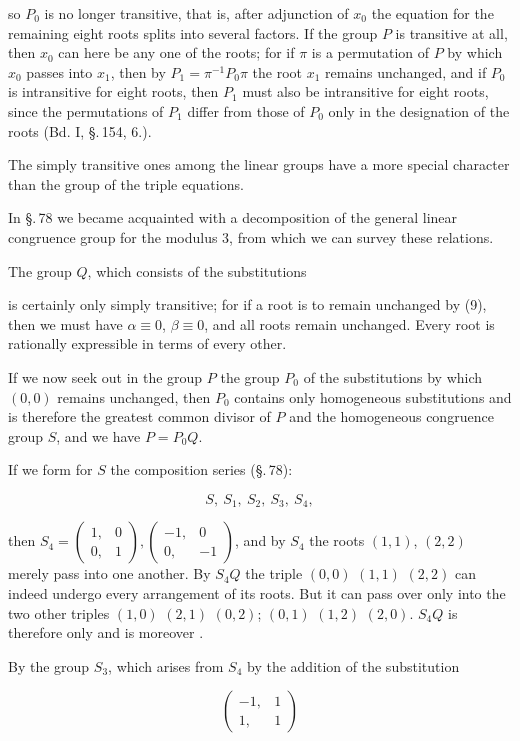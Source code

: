 so $P_0$ is no longer transitive, that is, after adjunction of $x_0$
the equation for the remaining eight roots splits into several factors. If the
group $P$ is transitive at all, then $x_0$ can here be any one of the roots;
for if $\pi$ is a permutation of $P$ by which $x_0$ passes into $x_1$,
then by $P_1 = \pi^{-1} P_0 \pi$ the root $x_1$ remains unchanged, and if $P_0$
is intransitive for eight roots, then $P_1$ must also be intransitive for eight roots,
since the permutations of $P_1$ differ from those of $P_0$ only in the designation of the
roots (Bd. I, §.\,154, 6.).

The simply transitive ones among the linear groups have a more special character
than the group of the triple equations.

In §.\,78 we became acquainted with a decomposition of the general linear congruence
group for the modulus 3, from which we can survey these relations.

The  group $Q$, which consists of the substitutions


is certainly only simply transitive; for if a root is to remain unchanged
by (9), then we must have $\alpha \equiv 0$, $\beta \equiv 0$, and all roots remain
unchanged. Every root is rationally expressible in terms of every other.

If we now seek out in the group $P$ the group $P_0$ of the substitutions by which
$(0,0)$ remains unchanged, then $P_0$ contains only homogeneous substitutions and is
therefore the greatest common divisor of $P$ and the homogeneous congruence group $S$,
and we have $P = P_0 Q$.

If we form for $S$ the composition series (§.\,78):

\[
S,\ S_1,\ S_2,\ S_3,\ S_4,
\]

then $S_4 = \begin{pmatrix} 1, & 0 \\ 0, & 1 \end{pmatrix}, \begin{pmatrix} -1, & 0 \\ 0, & -1 \end{pmatrix}$,
and by $S_4$ the roots $(1,1)$, $(2,2)$ merely pass into one another. By $S_4 Q$
the triple $(0,0)$ $(1,1)$ $(2,2)$ can indeed undergo every arrangement of its roots.
But it can pass over only into the two other triples $(1,0)$ $(2,1)$ $(0,2)$;
$(0,1)$ $(1,2)$ $(2,0)$. $S_4 Q$ is therefore only  and
is moreover .

By the group $S_3$, which arises from $S_4$ by the addition of the
substitution

\[
\begin{pmatrix} -1, & 1 \\ 1, & 1 \end{pmatrix}
\]

